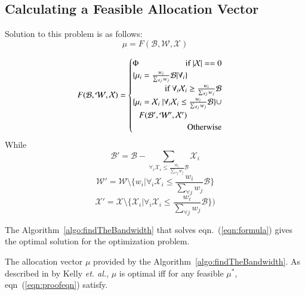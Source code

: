 \subsection{Calculating a Feasible Allocation Vector}
Solution to this problem is as follows: $$\mu = F(\mathcal{B}, \mathcal{W}, \mathcal{X})$$

\begin{equation}
\label{eqn:formula}
F(\mathcal{B}, \mathcal{W}, \mathcal{X}) = 
\begin{cases}
\Phi \hfill \text{if } |\mathcal{X}| == 0 \\ 

\{\mu_i = \frac{w_i}{\sum_{\forall j}w_j} \mathcal{B} | \forall_i\} \\
\hfill \text{if } \forall_i \mathcal{X}_i \ge \frac{w_i}{\sum_{\forall j}w_j} \mathcal{B} \\

\{\mu_i = \mathcal{X}_i\ | \forall_i \mathcal{X}_i \le \frac{w_i}{\sum_{\forall j}w_j} \mathcal{B} \} \cup \\
\ \ \ F(\mathcal{B}', \mathcal{W}', \mathcal{X}') \\
	\hfill \text{Otherwise}
\end{cases} \\
\end{equation}
While 
$$\mathcal{B}' = \mathcal{B} - \sum_{\forall_i \mathcal{X}_i \le \frac{w_i}{\sum_{\forall j}w_j} \mathcal{B}} \mathcal{X}_i$$
$$\mathcal{W}' = \mathcal{W} \setminus \{w_i | \forall_i \mathcal{X}_i \le \frac{w_i}{\sum_{\forall j}w_j} \mathcal{B} \}$$
$$\mathcal{X}' = \mathcal{X} \setminus \{\mathcal{X}_i | \forall_i \mathcal{X}_i \le \frac{w_i}{\sum_{\forall j}w_j} \mathcal{B}\})$$


\begin{theorem}
	The Algorithm~\ref{algo:findTheBandwidth} that solves eqn.~(\ref{eqn:formula}) gives the optimal solution for the optimization problem.
\end{theorem}

The allocation vector $\mu$ provided by the Algorithm~\ref{algo:findTheBandwidth}. As described in \cite{Kelly1998} by Kelly {\it et. al.}, $\mu$ is optimal iff for any feasible $\mu^*$, eqn~(\ref{eqn:proofeqn}) satisfy.

